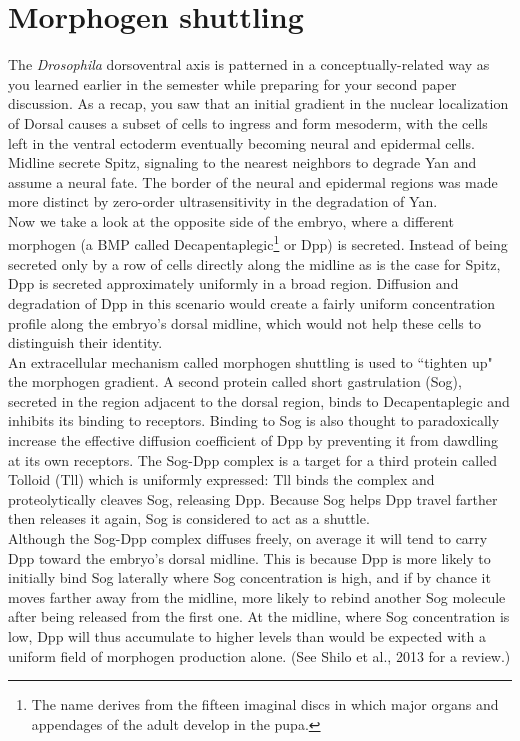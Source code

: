 \documentclass{article}
\begin{document}
\section*{Morphogen shuttling}

The \textit{Drosophila} dorsoventral axis is patterned in a conceptually-related way as you learned earlier in the semester while preparing for your second paper discussion. As a recap, you saw that an initial gradient in the nuclear localization of Dorsal causes a subset of cells to ingress and form mesoderm, with the cells left in the ventral ectoderm eventually becoming neural and epidermal cells. Midline secrete Spitz, signaling to the nearest neighbors to degrade Yan and assume a neural fate. The border of the neural and epidermal regions was made more distinct by zero-order ultrasensitivity in the degradation of Yan.\\

Now we take a look at the opposite side of the embryo, where a different morphogen (a BMP called Decapentaplegic\footnote{The name derives from the fifteen imaginal discs in which major organs and appendages of the adult develop in the pupa.} or Dpp) is secreted. Instead of being secreted only by a row of cells directly along the midline as is the case for Spitz, Dpp is secreted approximately uniformly in a broad region. Diffusion and degradation of Dpp in this scenario would create a fairly uniform concentration profile along the embryo's dorsal midline, which would not help these cells to distinguish their identity.\\

An extracellular mechanism called morphogen shuttling is used to ``tighten up" the morphogen gradient. A second protein called short gastrulation (Sog), secreted in the region adjacent to the dorsal region, binds to Decapentaplegic and inhibits its binding to receptors. Binding to Sog is also thought to paradoxically increase the effective diffusion coefficient of Dpp by preventing it from dawdling at its own receptors. The Sog-Dpp complex is a target for a third protein called Tolloid (Tll) which is uniformly expressed: Tll binds the complex and proteolytically cleaves Sog, releasing Dpp. Because Sog helps Dpp travel farther then releases it again, Sog is considered to act as a shuttle.\\

Although the Sog-Dpp complex diffuses freely, on average it will tend to carry Dpp toward the embryo's dorsal midline. This is because Dpp is more likely to initially bind Sog laterally where Sog concentration is high, and if by chance it moves farther away from the midline, more likely to rebind another Sog molecule after being released from the first one.  At the midline, where Sog concentration is low, Dpp will thus accumulate to higher levels than would be expected with a uniform field of morphogen production alone. (See Shilo et al., 2013 for a review.)\\
\end{document}
